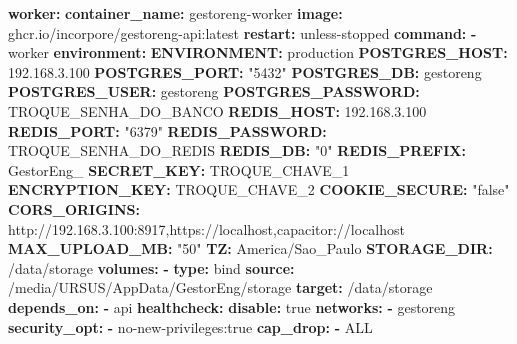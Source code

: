 \documentclass[
  10pt,
]{article}
\newenvironment{Shaded}{\begin{snugshade}}{\end{snugshade}}
\newcommand{\AttributeTok}[1]{\textcolor[rgb]{0.13,0.29,0.53}{#1}}
\newcommand{\CharTok}[1]{\textcolor[rgb]{0.31,0.60,0.02}{#1}}
\newcommand{\FloatTok}[1]{\textcolor[rgb]{0.00,0.00,0.81}{#1}}
\newcommand{\FunctionTok}[1]{\textcolor[rgb]{0.13,0.29,0.53}{\textbf{#1}}}
\newcommand{\KeywordTok}[1]{\textcolor[rgb]{0.13,0.29,0.53}{\textbf{#1}}}
\newcommand{\StringTok}[1]{\textcolor[rgb]{0.31,0.60,0.02}{#1}}
\begin{document}
\begin{Shaded}
\begin{Highlighting}[]
\AttributeTok{  }\FunctionTok{worker}\KeywordTok{:}
\AttributeTok{    }\FunctionTok{container\_name}\KeywordTok{:}\AttributeTok{ gestoreng{-}worker}
\AttributeTok{    }\FunctionTok{image}\KeywordTok{:}\AttributeTok{ ghcr.io/incorpore/gestoreng{-}api:latest}
\AttributeTok{    }\FunctionTok{restart}\KeywordTok{:}\AttributeTok{ unless{-}stopped}
\AttributeTok{    }\FunctionTok{command}\KeywordTok{:}
\AttributeTok{      }\KeywordTok{{-}}\AttributeTok{ worker}
\AttributeTok{    }\FunctionTok{environment}\KeywordTok{:}
\AttributeTok{      }\FunctionTok{ENVIRONMENT}\KeywordTok{:}\AttributeTok{ production}
\AttributeTok{      }\FunctionTok{POSTGRES\_HOST}\KeywordTok{:}\AttributeTok{ }\FloatTok{192.168.3.100}
\AttributeTok{      }\FunctionTok{POSTGRES\_PORT}\KeywordTok{:}\AttributeTok{ }\StringTok{"5432"}
\AttributeTok{      }\FunctionTok{POSTGRES\_DB}\KeywordTok{:}\AttributeTok{ gestoreng}
\AttributeTok{      }\FunctionTok{POSTGRES\_USER}\KeywordTok{:}\AttributeTok{ gestoreng}
\AttributeTok{      }\FunctionTok{POSTGRES\_PASSWORD}\KeywordTok{:}\AttributeTok{ TROQUE\_SENHA\_DO\_BANCO}
\AttributeTok{      }\FunctionTok{REDIS\_HOST}\KeywordTok{:}\AttributeTok{ }\FloatTok{192.168.3.100}
\AttributeTok{      }\FunctionTok{REDIS\_PORT}\KeywordTok{:}\AttributeTok{ }\StringTok{"6379"}
\AttributeTok{      }\FunctionTok{REDIS\_PASSWORD}\KeywordTok{:}\AttributeTok{ TROQUE\_SENHA\_DO\_REDIS}
\AttributeTok{      }\FunctionTok{REDIS\_DB}\KeywordTok{:}\AttributeTok{ }\StringTok{"0"}
\AttributeTok{      }\FunctionTok{REDIS\_PREFIX}\KeywordTok{:}\AttributeTok{ GestorEng\_}
\AttributeTok{      }\FunctionTok{SECRET\_KEY}\KeywordTok{:}\AttributeTok{ TROQUE\_CHAVE\_1}
\AttributeTok{      }\FunctionTok{ENCRYPTION\_KEY}\KeywordTok{:}\AttributeTok{ TROQUE\_CHAVE\_2}
\AttributeTok{      }\FunctionTok{COOKIE\_SECURE}\KeywordTok{:}\AttributeTok{ }\StringTok{"false"}
\AttributeTok{      }\FunctionTok{CORS\_ORIGINS}\KeywordTok{:}\AttributeTok{ http://192.168.3.100:8917,https://localhost,capacitor://localhost}
\AttributeTok{      }\FunctionTok{MAX\_UPLOAD\_MB}\KeywordTok{:}\AttributeTok{ }\StringTok{"50"}
\AttributeTok{      }\FunctionTok{TZ}\KeywordTok{:}\AttributeTok{ America/Sao\_Paulo}
\AttributeTok{      }\FunctionTok{STORAGE\_DIR}\KeywordTok{:}\AttributeTok{ /data/storage}
\AttributeTok{    }\FunctionTok{volumes}\KeywordTok{:}
\AttributeTok{      }\KeywordTok{{-}}\AttributeTok{ }\FunctionTok{type}\KeywordTok{:}\AttributeTok{ bind}
\AttributeTok{        }\FunctionTok{source}\KeywordTok{:}\AttributeTok{ /media/URSUS/AppData/GestorEng/storage}
\AttributeTok{        }\FunctionTok{target}\KeywordTok{:}\AttributeTok{ /data/storage}
\AttributeTok{    }\FunctionTok{depends\_on}\KeywordTok{:}
\AttributeTok{      }\KeywordTok{{-}}\AttributeTok{ api}
\AttributeTok{    }\FunctionTok{healthcheck}\KeywordTok{:}
\AttributeTok{      }\FunctionTok{disable}\KeywordTok{:}\AttributeTok{ }\CharTok{true}
\AttributeTok{    }\FunctionTok{networks}\KeywordTok{:}
\AttributeTok{      }\KeywordTok{{-}}\AttributeTok{ gestoreng}
\AttributeTok{    }\FunctionTok{security\_opt}\KeywordTok{:}
\AttributeTok{      }\KeywordTok{{-}}\AttributeTok{ no{-}new{-}privileges:true}
\AttributeTok{    }\FunctionTok{cap\_drop}\KeywordTok{:}
\AttributeTok{      }\KeywordTok{{-}}\AttributeTok{ ALL}


\end{Highlighting}
\end{Shaded}
\end{document}
